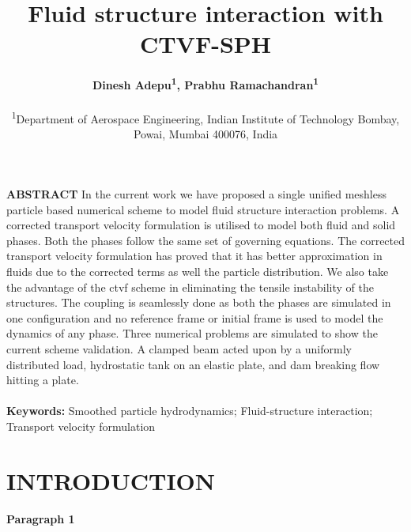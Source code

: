 \documentclass[10pt, conference]{FMFP2022}
\begin{document}
\title{\LARGE{ \bf Fluid structure interaction with CTVF-SPH}}
\author{\textbf{Dinesh Adepu\textsuperscript{1}, Prabhu Ramachandran\textsuperscript{1}}\\\\
\textsuperscript{1}\small{Department of Aerospace Engineering, Indian Institute of
    Technology Bombay, Powai, Mumbai 400076, India}}

\maketitle
\thispagestyle{fancy}
\pagestyle{plain} %

\noindent \textbf{ABSTRACT} In the current work we have proposed a single
unified meshless particle based numerical scheme to model fluid structure
interaction problems. A corrected transport velocity formulation is utilised to
model both fluid and solid phases. Both the phases follow the same set of
governing equations. The corrected transport velocity formulation has proved
that it has better approximation in fluids due to the corrected terms as well
the particle distribution. We also take the advantage of the ctvf scheme in
eliminating the tensile instability of the structures. The coupling is
seamlessly done as both the phases are simulated in one configuration and no
reference frame or initial frame is used to model the dynamics of any phase.
Three numerical problems are simulated to show the current scheme validation. A
clamped beam acted upon by a uniformly distributed load, hydrostatic tank on an
elastic plate, and dam breaking flow hitting a plate.
\\\\
\noindent
\textbf{Keywords:} Smoothed particle hydrodynamics; Fluid-structure interaction; Transport velocity formulation \\

\section{{\textbf{INTRODUCTION}}}

\textbf{Paragraph 1}
\end{document}
